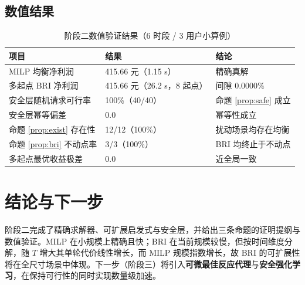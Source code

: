 \documentclass[UTF8,a4paper,11pt]{ctexart}
\theoremstyle{remark}
\begin{document}
\subsection{数值结果}
\begin{table}[htbp]
\centering
\small
\caption{阶段二数值验证结果（6 时段 / 3 用户小算例）}
\begin{tabular}{p{5.4cm} p{5.4cm} p{4.0cm}}
\toprule
\textbf{项目} & \textbf{结果} & \textbf{结论}\\
\midrule
MILP 均衡净利润 & 415.66 元（1.15 s） & 精确真解\\
多起点 BRI 净利润 & 415.66 元（26.2 s，8 起点） & 间隙 $0.0000\%$\\
安全层随机请求可行率 & 100\%（40/40） & 命题 \ref{prop:safe} 成立\\
安全层幂等偏差 & $0.0$ & 幂等性成立\\
命题 \ref{prop:exist} 存在性 & 12/12（100\%） & 扰动场景均存在均衡\\
命题 \ref{prop:bri} 不动点率 & 3/3（100\%） & BRI 均终止于不动点\\
多起点最优收益极差 & $0.0$ & 近全局一致\\
\bottomrule
\end{tabular}
\end{table}

\section{结论与下一步}
阶段二完成了精确求解器、可扩展启发式与安全层，并给出三条命题的证明提纲与数值验证。MILP 在小规模上精确且快；BRI 在当前规模较慢，但按时间维度分解，随 $T$ 增大其单轮代价线性增长，而 MILP 规模指数增长，故 BRI 的可扩展性将在全尺寸场景中体现。下一步（阶段三）将引入\textbf{可微最佳反应代理}与\textbf{安全强化学习}，在保持可行性的同时实现数量级加速。
\end{document}
